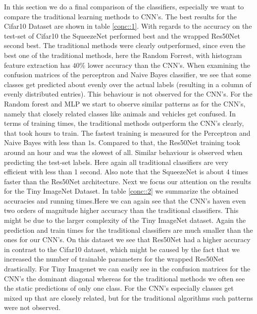 \documentclass[11pt]{article}
\begin{document}
In this section we do a final comparison of the classifiers, especially we want to compare the traditional learning methods to CNN's. The best results for the Cifar10 Dataset are shown in table \ref{conc::1}. With regards to the accuracy on the test-set of Cifar10 the SqueezeNet performed best and the wrapped Res50Net second best. The traditional methods were clearly outperformed, since even the best one of the traditional methods, here the Random Forrest, with histogram feature extraction has $40\%$ lower accuracy than the CNN's. When examining the confusion matrices of the perceptron and Naive Bayes classifier, we see that some classes get predicted about evenly over the actual labels (resulting in a column of evenly distributed entries). This behaviour is not observed for the CNN's. For the Random forest and MLP we start to observe similar patterns as for the CNN's, namely that closely related classes like animals and vehicles get confused. In terms of training times, the traditional methods outperform the CNN's clearly, that took hours to train. The fastest training is measured for the Perceptron and Naive Bayes with less than $1\text{s}$. Compared to that, the Res50Net training took around an hour and was the slowest of all. Similar behaviour is observed when predicting the test-set labels. Here again all traditional classifiers are very efficient with less than 1 second. Also note that the SqueezeNet is about 4 times faster than the Res50Net architecture.
Next we focus our attention on the results for the Tiny ImageNet Dataset. In table \ref{conc::2} we summarize the obtained accuracies and running times.Here we can again see that the CNN's haven even two orders of magnitude higher accuracy than the traditional classifiers. This might be due to the larger complexity of the Tiny ImageNet dataset. Again the prediction and train times for the traditional classifiers are much smaller than the ones for our CNN's. On this dataset we see that Res50Net had a higher accuracy in contrast to the Cifar10 dataset, which might be caused by the fact that we increased the number of trainable parameters for the wrapped Res50Net drastically. For Tiny Imagenet we can easily see in the confusion matrices for the CNN's the dominant diagonal whereas for the traditional methods we often see the static predictions of only one class. For the CNN's especially classes get mixed up that are closely related, but for the traditional algorithms such patterns were not observed.
\end{document}
